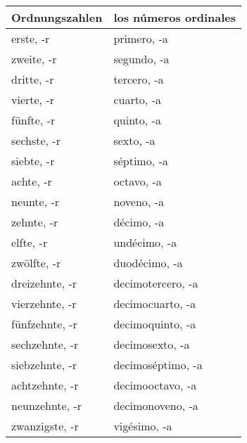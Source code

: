 \documentclass{spanish_summary}
\begin{document}
\newpage

\begin{longtable}{p{} | p{}} 
\textbf{Ordnungszahlen}     & \textbf{los números ordinales}                                       \\ \hline
\hline
\endhead %
erste, -r & primero, -a\\
zweite, -r & segundo, -a\\
dritte, -r & tercero, -a\\
vierte, -r & cuarto, -a\\
fünfte, -r & quinto, -a\\
sechste, -r & sexto, -a\\
siebte, -r & séptimo, -a\\
achte, -r & octavo, -a\\
neunte, -r & noveno, -a\\
zehnte, -r & décimo, -a\\
elfte, -r & undécimo, -a\\
zwölfte, -r & duodécimo, -a\\
dreizehnte, -r & decimotercero, -a\\
vierzehnte, -r & decimocuarto, -a\\
fünfzehnte, -r & decimoquinto, -a\\
sechzehnte, -r & decimosexto, -a\\
siebzehnte, -r & decimoséptimo, -a\\
achtzehnte, -r & decimooctavo, -a\\
neunzehnte, -r & decimonoveno, -a\\
zwanzigste, -r & vigésimo, -a



\end{longtable}
\end{document}
